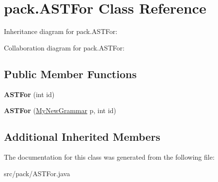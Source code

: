 \hypertarget{classpack_1_1_a_s_t_for}{}\section{pack.\+A\+S\+T\+For Class Reference}
\label{classpack_1_1_a_s_t_for}


Inheritance diagram for pack.\+A\+S\+T\+For\+:


Collaboration diagram for pack.\+A\+S\+T\+For\+:
\subsection*{Public Member Functions}
\begin{DoxyCompactItemize}
\item 
{\bfseries A\+S\+T\+For} (int id)\hypertarget{classpack_1_1_a_s_t_for_a1176a39b5e3d4a067a1611536d0742d1}{}\label{classpack_1_1_a_s_t_for_a1176a39b5e3d4a067a1611536d0742d1}

\item 
{\bfseries A\+S\+T\+For} (\hyperlink{classpack_1_1_my_new_grammar}{My\+New\+Grammar} p, int id)\hypertarget{classpack_1_1_a_s_t_for_a623810d0915e10808bf964949e034069}{}\label{classpack_1_1_a_s_t_for_a623810d0915e10808bf964949e034069}

\end{DoxyCompactItemize}
\subsection*{Additional Inherited Members}


The documentation for this class was generated from the following file\+:\begin{DoxyCompactItemize}
\item 
src/pack/A\+S\+T\+For.\+java\end{DoxyCompactItemize}
